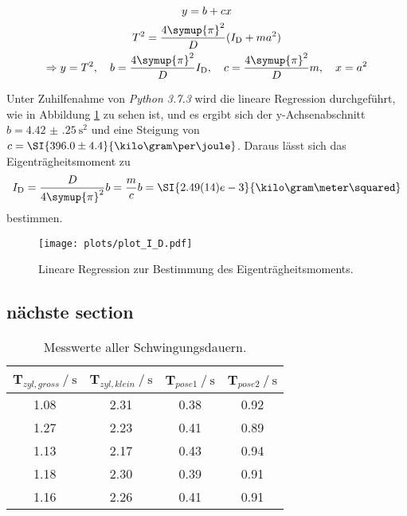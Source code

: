 \begin{gather}
y=b+cx \\
T^2 = \frac{4\symup{\pi}^2}{D}(I_\text{D}+ma^2) \\
\Rightarrow y = T^2, 
\quad b =  \frac{4\symup{\pi}^2}{D} I_\text{D}, 
\quad c = \frac{4\symup{\pi}^2}{D}m ,
\quad x = a^2 
\end{gather}

Unter Zuhilfenahme von \textit{Python 3.7.3} wird die lineare Regression durchgeführt, wie in Abbildung \ref{fig:Thoch2} zu sehen ist, und es ergibt sich der y-Achsenabschnitt~${b=\SI{4.42(25)}{\second\squared}}$
und eine Steigung von ${c=\SI{396.0\pm4.4}{\kilo\gram\per\joule}}$. 
Daraus lässt sich das Eigenträgheitsmoment zu 
\begin{equation}
    I_\text{D}=\frac{D}{4\symup{\pi}^2}b=\frac{m}{c}b=\SI{2.49(14)e-3}{\kilo\gram\meter\squared}
\end{equation}
bestimmen.

\begin{figure}
    \centering
    \texttt{[image: plots/plot\_I\_D.pdf]}
    \caption{Lineare Regression zur Bestimmung des Eigenträgheitsmoments.}
    \label{fig:Thoch2}
\end{figure}

\FloatBarrier
\subsection{nächste section}

\begin{table}
    \centering
    \caption{Messwerte aller Schwingungsdauern.}
    \label{tab:messSchwing}
    \begin{tabular}{c c c c}
        \toprule
        {T$_{zyl, gross}\:/\:\si{\second}$} & {T$_{zyl, klein}\:/\:\si{\second}$} & {T$_{pose1}\:/\:\si{\second}$} & {T$_{pose2}\:/\:\si{\second}$} \\
        \midrule
        1.08 & 2.31 & 0.38 & 0.92 \\
        1.27 & 2.23 & 0.41 & 0.89 \\
        1.13 & 2.17 & 0.43 & 0.94 \\
        1.18 & 2.30 & 0.39 & 0.91 \\
        1.16 & 2.26 & 0.41 & 0.91 \\
        \bottomrule
    \end{tabular}
\end{table}

